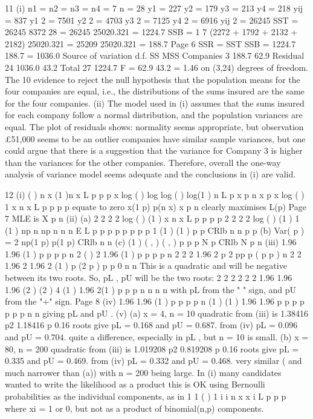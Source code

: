 \documentclass[a4paper,12pt]{article}
\begin{document}
11 (i) n1 = n2 = n3 = n4 = 7 n = 28
y1 = 227 y2 = 179 y3 = 213 y4 = 218 yij = 837
y1
2 = 7501 y2
2 = 4703 y3
2 = 7125 y4
2 = 6916 yij
2 = 26245
SST = 26245
8372
28
= 26245 25020.321 = 1224.7
SSB =
1
7
(2272 + 1792 + 2132 + 2182) 25020.321
= 25209 25020.321 = 188.7
Page 6
SSR = SST SSB = 1224.7 188.7 = 1036.0
Source of variation d.f. SS MSS
Companies 3 188.7 62.9
Residual 24 1036.0 43.2
Total 27 1224.7
F =
62.9
43.2
= 1.46 on (3,24) degrees of freedom.
The 10%
evidence to reject the null hypothesis that the population means for the four
companies are equal, i.e., the distributions of the sums insured are the same for
the four companies.
(ii) The model used in (i) assumes that the sums insured for each company follow
a normal distribution, and the population variances are equal.
The plot of residuals shows:
normality seems appropriate, but observation £51,000 seems to be an
outlier
companies have similar sample variances, but one could argue that there is
a suggestion that the variance for Company 3 is higher than the variances
for the other companies.
Therefore, overall the one-way analysis of variance model seems adequate and
the conclusions in (i) are valid.

12 (i) ( ) n x (1 )n x
L p p p
x
log ( ) log log ( ) log(1 )
n
L p x p n x p
x
log ( )
1
x n x
L p
p p p
equate to zero x(1 p) p(n x)
x
p
n
clearly maximises L(p)
Page 7
MLE is
X
p
n
(ii) (a)
2
2 2 2 log ( )
(1 )
x n x
L p
p p p
2
2 2 2 log ( )
(1 ) 1 (1 )
np n np n n n
E L p
p p p p p p p
1 (1 )
(1 )
p p
CRlb
n n
p p
(b) Var( p ) = 2
np(1 p) p(1 p)
CRlb
n n
(c)
(1 )
( , ) ( , )
p p
p N p CRlb N p
n
(iii) 1.96 1.96
(1 )
p p
p p
n
2
( ) 2
1.96
(1 )
p p
p p
n
2
2 2 1.96 2
p 2 pp p ( p p )
n
2 2
1.96 2 1.96 2
(1 ) p (2 p ) p p 0
n n
This is a quadratic and will be negative between its two roots.
So, pL , pU will be the two roots:
2 2 2
2 2
2
1.96 1.96 1.96
(2 ) (2 ) 4 (1 )
1.96
2(1 )
p p p
n n n
n
with pL from the " " sign, and pU from the "+" sign.
Page 8
(iv) 1.96 1.96
(1 )
p p
p p
n
(1 ) (1 )
1.96 1.96
p p p p
p p p
n n
giving pL and pU .
(v) (a) x = 4, n = 10
quadratic from (iii) is 1.38416 p2 1.18416 p 0.16
roots give pL = 0.168 and pU = 0.687.
from (iv) pL = 0.096 and pU = 0.704.
quite a difference, especially in pL , but n = 10 is small.
(b) x = 80, n = 200
quadratic from (iii) is 1.019208 p2 0.819208 p 0.16
roots give pL = 0.335 and pU = 0.469.
from (iv) pL = 0.332 and pU = 0.468.
very similar ( and much narrower than (a)) with n = 200 being large.
In (i) many candidates wanted to write the likelihood as a product this is OK using
Bernoulli probabilities as the individual components, as in
1
1
( ) 1 i i
n
x x
i
L p p p
where xi = 1 or 0, but not as a product of binomial(n,p) components.
\end{document}
